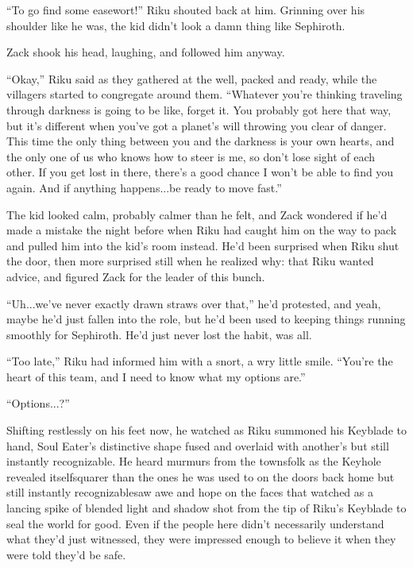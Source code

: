 ``To go find some easewort!'' Riku shouted back at him. Grinning over his shoulder like he was, the kid didn't look a damn thing like Sephiroth.

Zack shook his head, laughing, and followed him anyway.


\scenechange


``Okay,'' Riku said as they gathered at the well, packed and ready, while the villagers started to congregate around them. ``Whatever you're thinking traveling through darkness is going to be like, forget it. You probably got here that way, but it's different when you've got a planet's will throwing you clear of danger. This time the only thing between you and the darkness is your own hearts, and the only one of us who knows how to steer is me, so don't lose sight of each other. If you get lost in there, there's a good chance I won't be able to find you again. And if anything happens...be ready to move fast.''

The kid looked calm, probably calmer than he felt, and Zack wondered if he'd made a mistake the night before when Riku had caught him on the way to pack and pulled him into the kid's room instead. He'd been surprised when Riku shut the door, then more surprised still when he realized why: that Riku wanted advice, and figured Zack for the leader of this bunch.

``Uh...we've never exactly drawn straws over that,'' he'd protested, and yeah, maybe he'd just fallen into the role, but he'd been used to keeping things running smoothly for Sephiroth. He'd just never lost the habit, was all.

``Too late,'' Riku had informed him with a snort, a wry little smile. ``You're the heart of this team, and I need to know what my options are.''

``Options...?''

Shifting restlessly on his feet now, he watched as Riku summoned his Keyblade to hand, Soul Eater's distinctive shape fused and overlaid with another's but still instantly recognizable. He heard murmurs from the townsfolk as the Keyhole revealed itself\textemdash squarer than the ones he was used to on the doors back home but still instantly recognizable\textemdash saw awe and hope on the faces that watched as a lancing spike of blended light and shadow shot from the tip of Riku's Keyblade to seal the world for good. Even if the people here didn't necessarily understand what they'd just witnessed, they were impressed enough to believe it when they were told they'd be safe.

